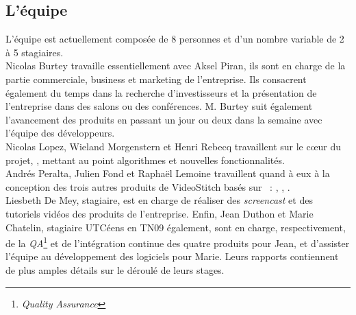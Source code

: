 \subsection{L'équipe}
L'équipe est actuellement composée de 8 personnes et d'un nombre variable de 2 à 5 stagiaires.\\
Nicolas Burtey travaille essentiellement avec Aksel Piran, ils sont en charge de
la partie commerciale, business et marketing de l'entreprise. Ils consacrent également
du temps dans la recherche d'investisseurs et la présentation de l'entreprise dans
des salons ou des conférences. M. Burtey suit également l'avancement des produits
en passant un jour ou deux dans la semaine avec l'équipe des développeurs.\\
Nicolas Lopez, Wieland Morgenstern et Henri Rebecq travaillent sur le c\oe ur du
projet, , mettant au point algorithmes et nouvelles fonctionnalités.\\
Andrés Peralta, Julien Fond et Raphaël Lemoine travaillent quand à eux à la conception 
des trois autres produits de VideoStitch basés sur ~: 
, , .\\
Liesbeth De Mey, stagiaire, est en charge de réaliser des \textit{screencast} et 
des tutoriels vidéos des produits de l'entreprise. Enfin, Jean Duthon et Marie
Chatelin, stagiaire UTCéens en TN09 également, sont en charge, respectivement,
de la \textit{QA}\footnote{\textit{Quality Assurance}} et de l'intégration continue
des quatre produits pour Jean, et d'assister l'équipe au développement des logiciels
pour Marie. Leurs rapports contiennent de plus amples détails sur le déroulé de 
leurs stages.

